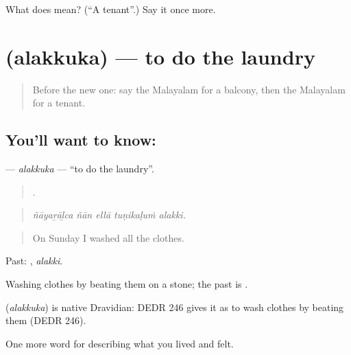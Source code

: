 \begin{tcolorbox}[breakable,colback=teal!4,colframe=teal!35!black,title={Before you move on}]
What does  mean? (\textquotedblleft{}A tenant\textquotedblright{}.) Say it once more.
\end{tcolorbox}
\section[\texorpdfstring{\ml{അലക്കുക} (alakkuka)}{അലക്കുക (alakkuka)}]{ (alakkuka) — to do the laundry}

\label{lesson:ML-C570-alakkuka-laundry}



\begin{quote}
Before the new one: say the Malayalam for a balcony, then the Malayalam for a tenant.
\end{quote}

\subsection*{You'll want to know: }
\textbf{} — \emph{alakkuka} — \textquotedblleft{}to do the laundry\textquotedblright{}.

\begin{quote}
    .
\end{quote}

\begin{quote}
\emph{ñāyaṟāḻca ñān ellā tuṇikaḷuṁ alakki.}
\end{quote}

\begin{quote}
On Sunday I washed all the clothes.
\end{quote}

Past: , \emph{alakki}.

Washing clothes by beating them on a stone; the past is .

\begin{cousinweb}
\textbf{} (\emph{alakkuka}) is native Dravidian: DEDR 246 gives it as to wash clothes by beating them (DEDR 246).
\end{cousinweb}

\begin{grammarlens}[title={What you've built}]
One more word for describing what you lived and felt.
\end{grammarlens}

